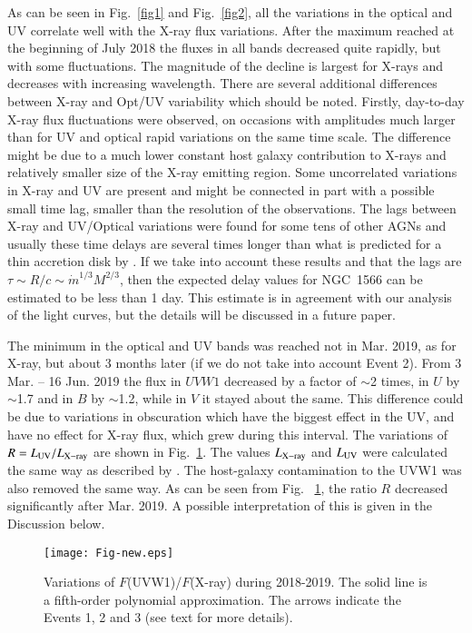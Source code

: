 \documentclass[fleqn,usenatbib]{mnras}
\begin{document}
As can be seen in Fig.~\ref{fig1} and Fig.~\ref{fig2}, all the variations in the optical and UV correlate well with the X-ray flux variations. After the maximum reached at the beginning of July 2018 the fluxes in all bands decreased quite rapidly, but with some fluctuations. The magnitude of the decline is largest for X-rays and decreases with increasing wavelength. There are several additional differences between  X-ray and Opt/UV variability which should be noted. Firstly, day-to-day X-ray flux fluctuations were observed, on occasions with amplitudes much larger than for UV and optical rapid variations on the same time scale. The difference  might be due to a much lower constant host galaxy contribution to X-rays and relatively smaller size of the X-ray emitting region. Some uncorrelated variations in X-ray and UV are present and might be connected in part with a possible  small time lag, smaller than the resolution of the observations. The lags between X-ray and UV/Optical variations  were  found for some tens of other AGNs \citep{Buisson2017} and usually these time delays are several times longer than what is predicted for a thin accretion disk by \cite{Shakura1973}. If we take into account these results and that the lags are $\tau\sim R/c\sim \dot{m}^{1/3}M^{2/3}$, then the expected delay values for NGC~1566 can be estimated to be less than 1 day. This estimate is in agreement with our analysis of the light curves, but the details will be discussed in a future paper.

The minimum in the optical and UV bands was reached not in  Mar. 2019, as for X-ray, but about 3 months later (if we do not take into account Event 2). From 3 Mar. -- 16 Jun. 2019 the flux in $UVW1$ decreased by a factor of $\sim$2 times, in $U$ by $\sim$1.7 and in $B$ by $\sim$1.2, while in $V$ it stayed about the same. This difference could be due to variations in obscuration which have the biggest effect in the UV, and have no effect for X-ray flux, which grew during this interval. The variations of $R=L_{\rm UV}/L_{\rm X-ray}$ are shown in Fig.~\ref{fig5}. The values $L_{\rm X-ray}$ and $L_{\rm UV}$ were calculated the same way as described by \cite{Ruan2019}. The host-galaxy contamination to the UVW1 was also removed the same way. As can be seen from Fig.~ \ref{fig5}, the ratio $R$ decreased significantly after Mar. 2019. A possible interpretation of this is given in the Discussion below.

\begin{figure}
\centering
\texttt{[image: Fig-new.eps]}
 \caption {Variations of $F$(UVW1)/$F$(X-ray) during 2018-2019. The solid line is a fifth-order polynomial approximation. The arrows indicate the Events 1, 2 and 3 (see text for more details).}
    \label{fig5}
\end{figure}
\end{document}
